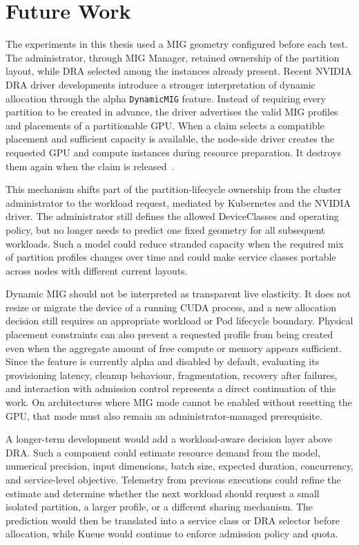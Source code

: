 \section{Future Work}
\label{sec:future-work}

The experiments in this thesis used a MIG geometry configured before each test. The administrator, through MIG Manager, retained ownership of the partition layout, while DRA selected among the instances already present. Recent NVIDIA DRA driver developments introduce a stronger interpretation of dynamic allocation through the alpha \texttt{DynamicMIG} feature. Instead of requiring every partition to be created in advance, the driver advertises the valid MIG profiles and placements of a partitionable GPU. When a claim selects a compatible placement and sufficient capacity is available, the node-side driver creates the requested GPU and compute instances during resource preparation. It destroys them again when the claim is released~\cite{nvidia2026drivermig}.

This mechanism shifts part of the partition-lifecycle ownership from the cluster administrator to the workload request, mediated by Kubernetes and the NVIDIA driver. The administrator still defines the allowed DeviceClasses and operating policy, but no longer needs to predict one fixed geometry for all subsequent workloads. Such a model could reduce stranded capacity when the required mix of partition profiles changes over time and could make service classes portable across nodes with different current layouts.

Dynamic MIG should not be interpreted as transparent live elasticity. It does not resize or migrate the device of a running CUDA process, and a new allocation decision still requires an appropriate workload or Pod lifecycle boundary. Physical placement constraints can also prevent a requested profile from being created even when the aggregate amount of free compute or memory appears sufficient. Since the feature is currently alpha and disabled by default, evaluating its provisioning latency, cleanup behaviour, fragmentation, recovery after failures, and interaction with admission control represents a direct continuation of this work. On architectures where MIG mode cannot be enabled without resetting the GPU, that mode must also remain an administrator-managed prerequisite.

A longer-term development would add a workload-aware decision layer above DRA. Such a component could estimate resource demand from the model, numerical precision, input dimensions, batch size, expected duration, concurrency, and service-level objective. Telemetry from previous executions could refine the estimate and determine whether the next workload should request a small isolated partition, a larger profile, or a different sharing mechanism. The prediction would then be translated into a service class or DRA selector before allocation, while Kueue would continue to enforce admission policy and quota.

